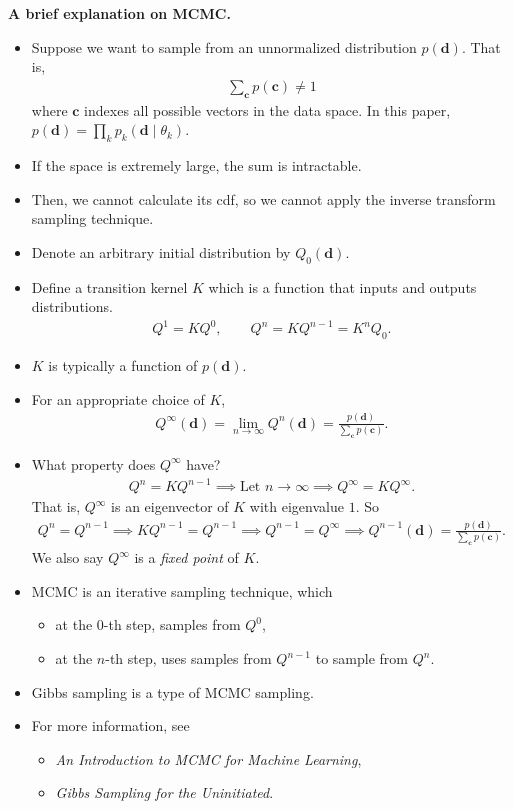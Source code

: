 \documentclass[10pt]{article}
\begin{document}
\textbf{A brief explanation on MCMC.}
\begin{itemize}
\item Suppose we want to sample from an unnormalized distribution $p(\mathbf{d})$. That is,
\begin{align*}
\sum_\mathbf{c} p(\mathbf{c}) \neq 1
\end{align*}
where $\mathbf{c}$ indexes all possible vectors in the data space. In this paper, $p(\mathbf{d}) = \prod_k p_k(\mathbf{d} \mid \theta_k)$.
\item If the space is extremely large, the sum is intractable.
\item Then, we cannot calculate its cdf, so we cannot apply the inverse transform sampling technique.
\item Denote an arbitrary initial distribution by $Q_0(\mathbf{d})$.
\item Define a transition kernel $K$ which is a function that inputs and outputs distributions.
\begin{align*}
Q^1 = K Q^0, \qquad Q^n = K Q^{n - 1} =  K^n Q_0.
\end{align*}
\item $K$ is typically a function of $p(\mathbf{d})$.
\item For an appropriate choice of $K$,
\begin{align*}
Q^\infty(\mathbf{d}) = \lim_{n \rightarrow \infty} Q^n(\mathbf{d}) = \frac{p(\mathbf{d})}{\sum_\mathbf{c} p(\mathbf{c})}.
\end{align*}
\item What property does $Q^\infty$ have?
\begin{align*}
Q^n = KQ^{n - 1} \implies \text{Let } n \rightarrow \infty \implies Q^\infty = KQ^\infty.
\end{align*}
That is, $Q^\infty$ is an eigenvector of $K$ with eigenvalue $1$. So
\begin{align*}
Q^n = Q^{n - 1} \implies KQ^{n - 1} = Q^{n - 1} \implies Q^{n - 1} = Q^\infty \implies Q^{n - 1}(\mathbf{d}) = \frac{p(\mathbf{d})}{\sum_\mathbf{c} p(\mathbf{c})}.
\end{align*}
We also say $Q^\infty$ is a \textit{fixed point} of $K$.
\item MCMC is an iterative sampling technique, which
\begin{itemize}
\item at the $0$-th step, samples from $Q^0$,
\item at the $n$-th step, uses samples from $Q^{n - 1}$ to sample from $Q^n$.
\end{itemize}
\item Gibbs sampling is a type of MCMC sampling.
\item For more information, see
\begin{itemize}
\item \textit{An Introduction to MCMC for Machine Learning},
\item \textit{Gibbs Sampling for the Uninitiated}.
\end{itemize}
\end{itemize}
\end{document}
